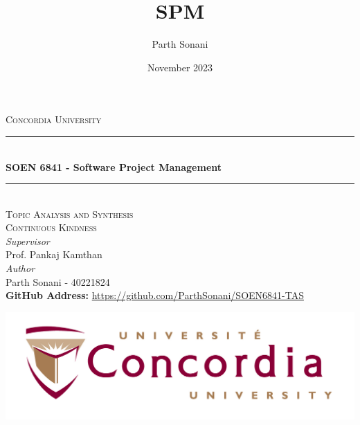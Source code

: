 \documentclass[a4paper, 11pt]{report}
\title{SPM}
\author{Parth Sonani}
\date{November 2023}
\begin{document}
\begin{titlepage} %
	\newcommand{\HRule}{\rule{\linewidth}{0.5mm}} %
	
	\center %
	
	
	\textsc{\LARGE Concordia University}\\[1.5cm] %
	

	
	\HRule\\[0.4cm]
	
	{\huge\bfseries  SOEN 6841 - Software Project Management}\\[0.4cm] %
	
	\HRule\\[1.5cm]
	\textsc{\Large Topic Analysis and Synthesis}\\[0.5cm] %
	\textsc{\Large Continuous Kindness}\\[0.5cm]
	
			\large
			\textit{Supervisor}\\
			Prof. Pankaj Kamthan\\[0.5cm] %
    \vfill
    \large
			\textit{Author}\\
            Parth Sonani - \textsc{40221824}\\
            
	
	\vfill\vfill\vfill\vfill%
	\textbf{GitHub Address:} \url{https://github.com/ParthSonani/SOEN6841-TAS}

	
 	\vfill\vfill
 	\includegraphics[scale=0.5]{Concordia-logo.jpeg}\\[1cm] %
	 

\end{titlepage}
\end{document}
